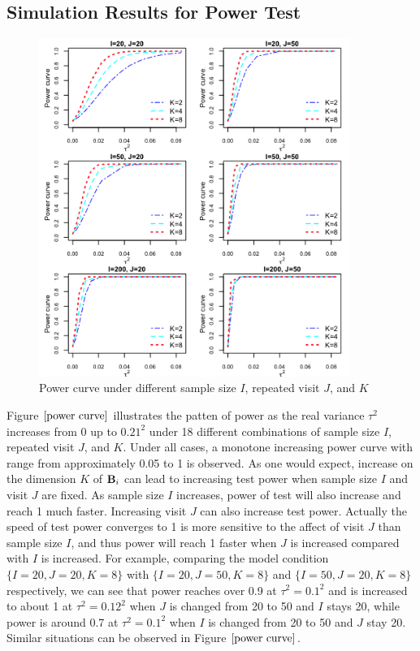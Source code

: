 \subsection{Simulation Results for Power Test}
\begin{figure}[h!]
\centering
\includegraphics[width=0.9\textwidth]{power_suedo.png}
\caption{Power curve under different sample size $I$, repeated visit $J$, and $K$}
\label{power curve}
\end{figure}

Figure $\ref{power curve}$ illustrates the patten of power as the real variance $\tau^2$ increases from 0 up to $0.21^2$ under 18 different combinations of sample size $I$, repeated visit $J$, and $K$. Under all cases, a monotone increasing power curve with range from approximately 0.05 to 1 is observed. As one would expect, increase on the dimension $K$ of $\V{b}_i$ can lead to increasing test power when sample size $I$ and visit $J$ are fixed. As sample size $I$ increases, power of test will also increase and reach 1 much faster. Increasing visit $J$ can also increase test power. Actually the speed of test power converges to 1 is more sensitive to the affect of visit $J$ than sample size $I$, and thus power will reach 1 faster when $J$ is increased compared with $I$ is increased. For example, comparing the model condition $\{I=20, J=20, K=8\}$ with $\{I=20, J=50, K=8\}$ and $\{I=50, J=20, K=8\}$ respectively, we can see that power reaches over 0.9 at $\tau^2=0.1^2$ and is increased to about 1 at $\tau^2=0.12^2$ when $J$ is changed from 20 to 50 and $I$ stays 20, while power is around 0.7 at $\tau^2=0.1^2$ when $I$ is changed from 20 to 50 and $J$ stay 20. Similar situations can be observed in Figure $\ref{power curve}$.

